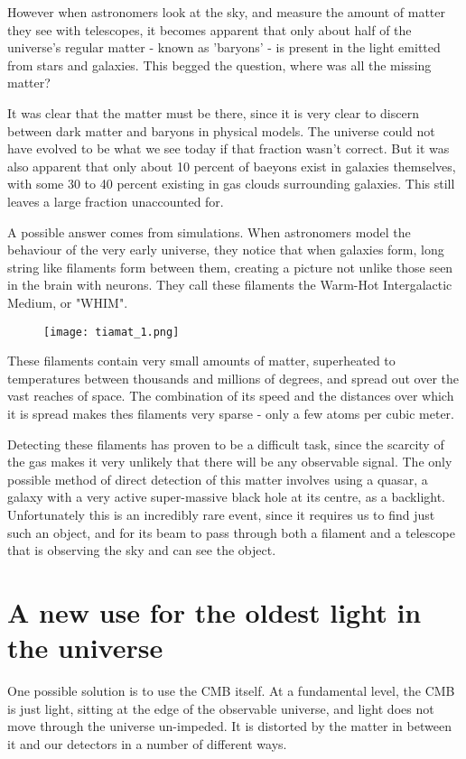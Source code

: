 \documentclass{nature}
\begin{document}
However when astronomers look at the sky, and measure the amount of matter they see with telescopes, it becomes apparent that only about half of the universe's regular matter - known as 'baryons' - is present in the light emitted from stars and galaxies. This begged the question, where was all the missing matter? 

It was clear that the matter must be there, since it is very clear to discern between dark matter and baryons in physical models. The universe could not have evolved to be what we see today if that fraction wasn't correct. But it was also apparent that only about 10 percent of baeyons exist in galaxies themselves, with some 30 to 40 percent existing in gas clouds surrounding galaxies. This still leaves a large fraction unaccounted for. 

A possible answer comes from simulations. When astronomers model the behaviour of the very early universe, they notice that when galaxies form, long string like filaments form between them, creating a picture not unlike those seen in the brain with neurons.
They call these filaments the Warm-Hot Intergalactic Medium, or "WHIM". 
\begin{figure}
    \texttt{[image: tiamat\_1.png]}
\end{figure}


These filaments contain very small amounts of matter, superheated to temperatures between thousands and millions of degrees, and spread out over the vast reaches of space. The combination of its speed and the distances over which it is spread makes thes filaments very sparse - only a few atoms per cubic meter. 

Detecting these filaments  has proven to be a difficult task, since the scarcity of the gas makes it very unlikely that there will be any observable signal. The only possible method of direct detection of this matter involves using a quasar, a galaxy with a very active super-massive black hole at its centre, as a backlight. Unfortunately this is an incredibly rare event, since it requires us to find just such an object, and for its beam to pass through both a filament and a telescope that is observing the sky and can see the object. 

\section{A new use for the oldest light in the universe}

One possible solution is to use the CMB itself. At a fundamental level, the CMB is just light, sitting at the edge of the observable universe, and light does not move through the universe un-impeded. It is distorted by the matter in between it and our detectors in a number of different ways.
\end{document}
